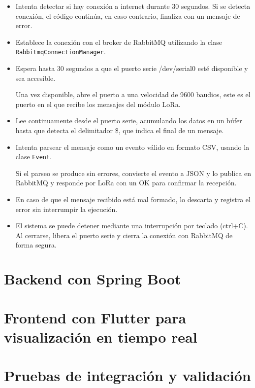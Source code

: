 \begin{itemize}
    \item Intenta detectar si hay conexión a internet durante 30 segundos.
    Si se detecta conexión, el código continúa, en caso contrario, finaliza con un mensaje de error.
    \item Establece la conexión con el broker de RabbitMQ utilizando la clase \texttt{RabbitmqConnectionManager}.
    \item Espera hasta 30 segundos a que el puerto serie /dev/serial0 esté disponible y sea accesible.

    Una vez disponible, abre el puerto a una velocidad de 9600 baudios, este es el puerto en el que recibe los mensajes del módulo LoRa.
    \item Lee continuamente desde el puerto serie, acumulando los datos en un búfer hasta que detecta el delimitador \$, que indica el final de un mensaje.
    \item Intenta parsear el mensaje como un evento válido en formato CSV, usando la clase \texttt{Event}.

    Si el parseo se produce sin errores, convierte el evento a JSON y lo publica en RabbitMQ y responde por LoRa con un OK para confirmar la recepción.
    \item En caso de que el mensaje recibido está mal formado, lo descarta y registra el error sin interrumpir la ejecución.
    \item El sistema se puede detener mediante una interrupción por teclado (ctrl+C). Al cerrarse, libera el puerto serie y cierra la conexión con RabbitMQ de forma segura.
\end{itemize}


\section{Backend con Spring Boot}


\section{Frontend con Flutter para visualización en tiempo real}


\section{Pruebas de integración y validación}


